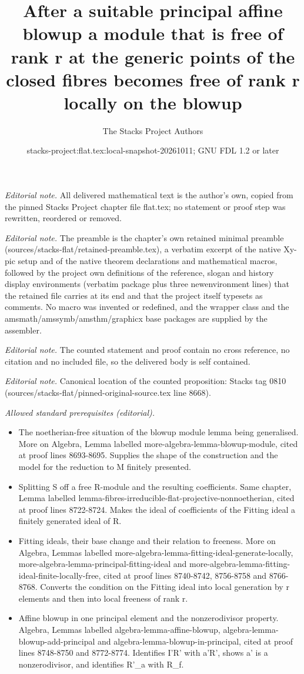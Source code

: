 \documentclass[10pt,a4paper]{amsart}
\title{After a suitable principal affine blowup a module that is free of rank r at the generic points of the closed fibres becomes free of rank r locally on the blowup}
\author{The Stacks Project Authors}
\date{stacks-project:flat.tex:local-snapshot-20261011; GNU FDL 1.2 or later}
\theoremstyle{plain}
\theoremstyle{definition}
\theoremstyle{remark}
\numberwithin{equation}{subsection}
\begin{document}
\maketitle
\noindent\textit{Editorial note.} All delivered mathematical text is the author's own, copied from the pinned Stacks Project chapter file flat.tex; no statement or proof step was rewritten, reordered or removed.\par\medskip
\noindent\textit{Editorial note.} The preamble is the chapter's own retained minimal preamble (sources/stacks-flat/retained-preamble.tex), a verbatim excerpt of the native Xy-pic setup and of the native theorem declarations and mathematical macros, followed by the project own definitions of the reference, slogan and history display environments (verbatim package plus three newenvironment lines) that the retained file carries at its end and that the project itself typesets as comments. No macro was invented or redefined, and the wrapper class and the amsmath/amssymb/amsthm/graphicx base packages are supplied by the assembler.\par\medskip
\noindent\textit{Editorial note.} The counted statement and proof contain no cross reference, no citation and no included file, so the delivered body is self contained.\par\medskip
\noindent\textit{Editorial note.} Canonical location of the counted proposition: Stacks tag 0810 (sources/stacks-flat/pinned-original-source.tex line 8668).\par\medskip
\noindent\textit{Allowed standard prerequisites (editorial).}\begin{itemize}
\item The noetherian-free situation of the blowup module lemma being generalised. More on Algebra, Lemma labelled more-algebra-lemma-blowup-module, cited at proof lines 8693-8695. Supplies the shape of the construction and the model for the reduction to M finitely presented.
\item Splitting S off a free R-module and the resulting coefficients. Same chapter, Lemma labelled lemma-fibres-irreducible-flat-projective-nonnoetherian, cited at proof lines 8722-8724. Makes the ideal of coefficients of the Fitting ideal a finitely generated ideal of R.
\item Fitting ideals, their base change and their relation to freeness. More on Algebra, Lemmas labelled more-algebra-lemma-fitting-ideal-generate-locally, more-algebra-lemma-principal-fitting-ideal and more-algebra-lemma-fitting-ideal-finite-locally-free, cited at proof lines 8740-8742, 8756-8758 and 8766-8768. Converts the condition on the Fitting ideal into local generation by r elements and then into local freeness of rank r.
\item Affine blowup in one principal element and the nonzerodivisor property. Algebra, Lemmas labelled algebra-lemma-affine-blowup, algebra-lemma-blowup-add-principal and algebra-lemma-blowup-in-principal, cited at proof lines 8748-8750 and 8772-8774. Identifies I'R' with a'R', shows a' is a nonzerodivisor, and identifies R'\_a with R\_f.
\end{itemize}\medskip
\end{document}
